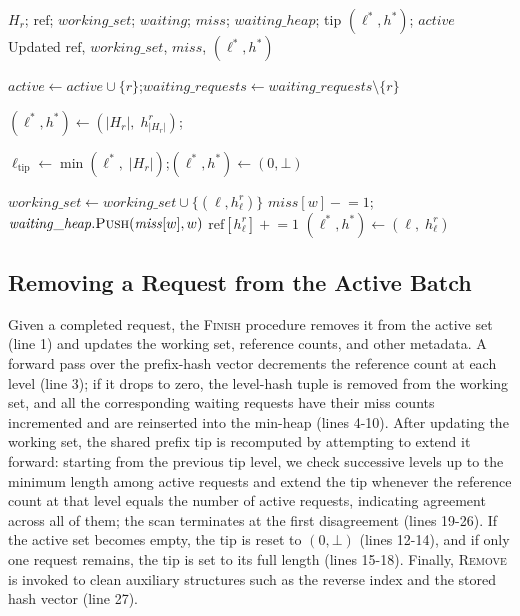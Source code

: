\begin{algorithm}[t]
\caption{\textsc{AddToBatch}(r)}
\label{alg:add_to_batch}
\begin{algorithmic}[1]
\Require $H_r$; $\mathrm{ref}$; $\mathit{working\_set}$; $\mathit{waiting}$; $\mathit{miss}$; $\mathit{waiting\_heap}$; tip $(\ell^*, h^*)$; $\mathit{active}$
\Ensure Updated $\mathrm{ref}$, $\mathit{working\_set}$, $\mathit{miss}$, $(\ell^*, h^*)$

\State $\mathit{active} \gets \mathit{active} \cup \{r\}$;\quad $\mathit{waiting\_requests} \gets \mathit{waiting\_requests} \setminus \{r\}$

  \State $(\ell^*, h^*) \gets (|H_r|,\; h_{|H_r|}^r)$;\quad \Return
\EndIf

\State $\ell_{\mathrm{tip}} \gets \min(\ell^*,\; |H_r|)$;\quad $(\ell^*, h^*) \gets (0, \bot)$

    \State $\mathit{working\_set} \gets \mathit{working\_set} \cup \{(\ell, h_\ell^r)\}$
      \State $\mathit{miss}[w] \mathrel{-}= 1$; 
      \State $\mathit{waiting\_heap}.\textsc{Push}(\mathit{miss}[w], w)$
    \EndFor
  \EndIf
  \State $\mathrm{ref}[h_\ell^r] \mathrel{+}= 1$
    \State $(\ell^*, h^*) \gets (\ell,\; h_\ell^r)$
  \EndIf
\EndFor
\end{algorithmic}
\end{algorithm}

\subsection{Removing a Request from the Active Batch}
Given a completed request, the \textsc{Finish} procedure removes it from the active set (line 1) and updates the working set, reference counts, and other metadata. A forward pass over the prefix-hash vector decrements the reference count at each level (line 3); if it drops to zero, the level-hash tuple is removed from the working set, and all the corresponding waiting requests have their miss counts incremented and are reinserted into the min-heap (lines 4-10). After updating the working set, the shared prefix tip is recomputed by attempting to extend it forward: starting from the previous tip level, we check successive levels up to the minimum length among active requests and extend the tip whenever the reference count at that level equals the number of active requests, indicating agreement across all of them; the scan terminates at the first disagreement (lines 19-26). If the active set becomes empty, the tip is reset to $(0, \bot)$ (lines 12-14), and if only one request remains, the tip is set to its full length (lines 15-18). Finally, \textsc{Remove} is invoked to clean auxiliary structures such as the reverse index and the stored hash vector (line 27).


